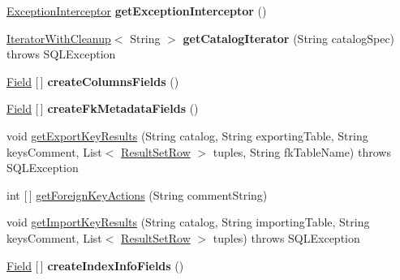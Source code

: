 \begin{DoxyCompactItemize}
\mbox{\hyperlink{interfacecom_1_1mysql_1_1jdbc_1_1_exception_interceptor}{Exception\+Interceptor}} {\bfseries get\+Exception\+Interceptor} ()
\item 
\mbox{\label{classcom_1_1mysql_1_1jdbc_1_1_database_meta_data_ab34f0beaf3fed85c2de45d025a257c96}} 
\mbox{\hyperlink{classcom_1_1mysql_1_1jdbc_1_1_database_meta_data_1_1_iterator_with_cleanup}{Iterator\+With\+Cleanup}}$<$ String $>$ {\bfseries get\+Catalog\+Iterator} (String catalog\+Spec)  throws S\+Q\+L\+Exception 
\item 
\mbox{\label{classcom_1_1mysql_1_1jdbc_1_1_database_meta_data_a5543fa205fbdc533d54cdc28ce4eadb6}} 
\mbox{\hyperlink{classcom_1_1mysql_1_1jdbc_1_1_field}{Field}} \mbox{[}$\,$\mbox{]} {\bfseries create\+Columns\+Fields} ()
\item 
\mbox{\label{classcom_1_1mysql_1_1jdbc_1_1_database_meta_data_a873f2e4c3bd578e36835bb973ec5a5eb}} 
\mbox{\hyperlink{classcom_1_1mysql_1_1jdbc_1_1_field}{Field}} \mbox{[}$\,$\mbox{]} {\bfseries create\+Fk\+Metadata\+Fields} ()
\item 
void \mbox{\hyperlink{classcom_1_1mysql_1_1jdbc_1_1_database_meta_data_a4b97c17b3d151680489b020f74b4299d}{get\+Export\+Key\+Results}} (String catalog, String exporting\+Table, String keys\+Comment, List$<$ \mbox{\hyperlink{classcom_1_1mysql_1_1jdbc_1_1_result_set_row}{Result\+Set\+Row}} $>$ tuples, String fk\+Table\+Name)  throws S\+Q\+L\+Exception 
\item 
int \mbox{[}$\,$\mbox{]} \mbox{\hyperlink{classcom_1_1mysql_1_1jdbc_1_1_database_meta_data_a83e22a1075216419f1fcd4d37b8b0fee}{get\+Foreign\+Key\+Actions}} (String comment\+String)
\item 
void \mbox{\hyperlink{classcom_1_1mysql_1_1jdbc_1_1_database_meta_data_a10b27f9a10b42626ac7b3c8f9571299d}{get\+Import\+Key\+Results}} (String catalog, String importing\+Table, String keys\+Comment, List$<$ \mbox{\hyperlink{classcom_1_1mysql_1_1jdbc_1_1_result_set_row}{Result\+Set\+Row}} $>$ tuples)  throws S\+Q\+L\+Exception 
\item 
\mbox{\label{classcom_1_1mysql_1_1jdbc_1_1_database_meta_data_af09e85192dd00aea6651204f04635729}} 
\mbox{\hyperlink{classcom_1_1mysql_1_1jdbc_1_1_field}{Field}} \mbox{[}$\,$\mbox{]} {\bfseries create\+Index\+Info\+Fields} ()

\end{DoxyCompactItemize}
